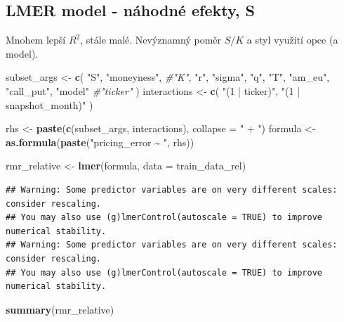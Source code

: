 \documentclass[
]{article}
\newenvironment{Shaded}{\begin{snugshade}}{\end{snugshade}}
\newcommand{\AttributeTok}[1]{\textcolor[rgb]{0.13,0.29,0.53}{#1}}
\newcommand{\CommentTok}[1]{\textcolor[rgb]{0.56,0.35,0.01}{\textit{#1}}}
\newcommand{\FunctionTok}[1]{\textcolor[rgb]{0.13,0.29,0.53}{\textbf{#1}}}
\newcommand{\NormalTok}[1]{#1}
\newcommand{\OtherTok}[1]{\textcolor[rgb]{0.56,0.35,0.01}{#1}}
\newcommand{\StringTok}[1]{\textcolor[rgb]{0.31,0.60,0.02}{#1}}
\begin{document}
\subsection{LMER model - náhodné efekty,
S}\label{lmer-model---nuxe1hodnuxe9-efekty-s}

Mnohem lepší \(R^2\), stále malé. Nevýznamný poměr \(S/K\) a styl
využití opce (a model).

\begin{Shaded}
\begin{Highlighting}[]
\NormalTok{subset\_args }\OtherTok{\textless{}{-}} \FunctionTok{c}\NormalTok{(}
  \StringTok{"S"}\NormalTok{,}
  \StringTok{"moneyness"}\NormalTok{,}
  \CommentTok{\#"K",}
  \StringTok{"r"}\NormalTok{,}
  \StringTok{"sigma"}\NormalTok{,}
  \StringTok{"q"}\NormalTok{,}
  \StringTok{"T"}\NormalTok{,}
  \StringTok{"am\_eu"}\NormalTok{,}
  \StringTok{"call\_put"}\NormalTok{,}
  \StringTok{"model"}
  \CommentTok{\#"ticker"}
\NormalTok{)}
\NormalTok{interactions }\OtherTok{\textless{}{-}} \FunctionTok{c}\NormalTok{(}
  \StringTok{"(1 | ticker)"}\NormalTok{,}
  \StringTok{"(1 | snapshot\_month)"}
\NormalTok{)}

\NormalTok{rhs }\OtherTok{\textless{}{-}} \FunctionTok{paste}\NormalTok{(}\FunctionTok{c}\NormalTok{(subset\_args, interactions), }\AttributeTok{collapse =} \StringTok{" + "}\NormalTok{)}
\NormalTok{formula }\OtherTok{\textless{}{-}} \FunctionTok{as.formula}\NormalTok{(}\FunctionTok{paste}\NormalTok{(}\StringTok{"pricing\_error \textasciitilde{} "}\NormalTok{, rhs))}

\NormalTok{rmr\_relative }\OtherTok{\textless{}{-}} \FunctionTok{lmer}\NormalTok{(formula, }\AttributeTok{data =}\NormalTok{ train\_data\_rel)}
\end{Highlighting}
\end{Shaded}

\begin{verbatim}
## Warning: Some predictor variables are on very different scales: consider rescaling. 
## You may also use (g)lmerControl(autoscale = TRUE) to improve numerical stability.
## Warning: Some predictor variables are on very different scales: consider rescaling. 
## You may also use (g)lmerControl(autoscale = TRUE) to improve numerical stability.
\end{verbatim}

\begin{Shaded}
\begin{Highlighting}[]
\FunctionTok{summary}\NormalTok{(rmr\_relative)}
\end{Highlighting}
\end{Shaded}
\end{document}
